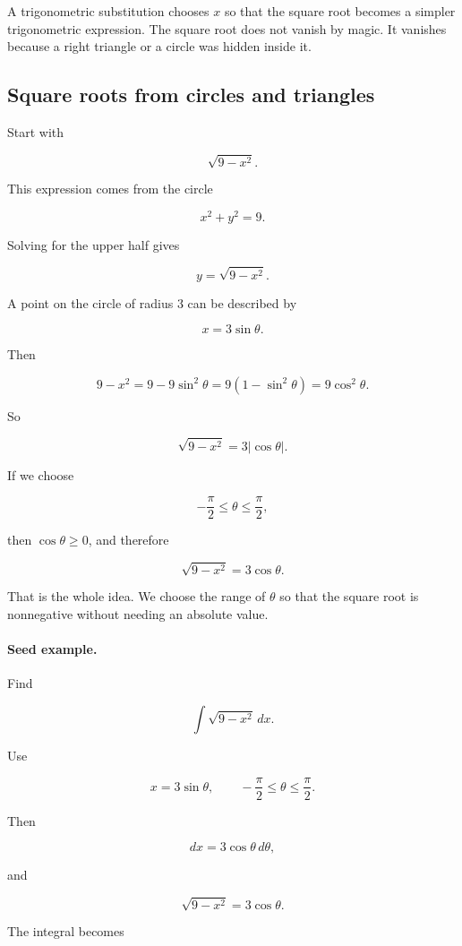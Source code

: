A trigonometric substitution chooses \(x\) so that the square root becomes a simpler
trigonometric expression.  The square root does not vanish by magic.  It vanishes
because a right triangle or a circle was hidden inside it.

\subsection{Square roots from circles and triangles}
\label{subsec:square-roots-circles-triangles}

Start with

\[
\sqrt{9-x^2}.
\]

This expression comes from the circle

\[
x^2+y^2=9.
\]

Solving for the upper half gives

\[
y=\sqrt{9-x^2}.
\]

A point on the circle of radius \(3\) can be described by

\[
x=3\sin\theta.
\]

Then

\[
9-x^2
=
9-9\sin^2\theta
=
9(1-\sin^2\theta)
=
9\cos^2\theta.
\]

So

\[
\sqrt{9-x^2}
=
3|\cos\theta|.
\]

If we choose

\[
-\frac{\pi}{2}\le \theta\le \frac{\pi}{2},
\]

then \(\cos\theta\ge0\), and therefore

\[
\sqrt{9-x^2}=3\cos\theta.
\]

That is the whole idea.  We choose the range of \(\theta\) so that the square root is
nonnegative without needing an absolute value.

\paragraph{Seed example.}
Find

\[
\int \sqrt{9-x^2}\,dx.
\]

Use

\[
x=3\sin\theta,
\qquad
-\frac{\pi}{2}\le \theta\le \frac{\pi}{2}.
\]

Then

\[
dx=3\cos\theta\,d\theta,
\]

and

\[
\sqrt{9-x^2}=3\cos\theta.
\]

The integral becomes

